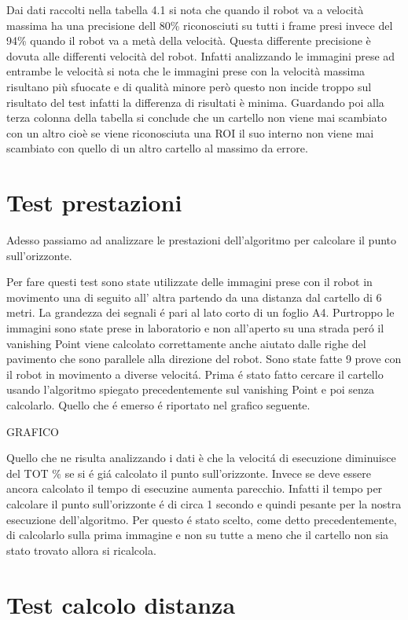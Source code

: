	Dai dati raccolti nella tabella 4.1 si nota che quando il robot va a velocità massima ha una precisione dell 80\% riconosciuti su tutti i frame presi invece del 94\% quando il robot va a metà della velocità. Questa differente precisione è dovuta alle differenti velocità del robot. Infatti analizzando le immagini prese ad entrambe le velocità si nota che le immagini prese con la velocità massima risultano più sfuocate e di qualità minore però questo non incide troppo sul risultato del test infatti la differenza di risultati è minima. Guardando poi alla terza colonna della tabella si conclude che un cartello non viene mai scambiato con un altro cioè se viene riconosciuta una ROI il suo interno non viene mai scambiato con quello di un altro cartello al massimo da errore.

\section{Test prestazioni}

	Adesso passiamo ad analizzare le prestazioni dell'algoritmo per calcolare il punto sull'orizzonte.

	Per fare questi test sono state utilizzate delle immagini prese con il robot in movimento una di seguito all' altra partendo da una distanza dal cartello di 6 metri. La grandezza dei segnali \'e pari al lato corto di un foglio A4. Purtroppo le immagini sono state prese in laboratorio e non all'aperto su una strada per\'o il vanishing Point viene calcolato correttamente anche aiutato dalle righe del pavimento che sono parallele alla direzione del robot. Sono state fatte 9 prove con il robot in movimento a diverse velocit\'a. Prima \'e stato fatto cercare il cartello usando l'algoritmo spiegato precedentemente sul vanishing Point e poi senza calcolarlo. Quello che \'e emerso \'e riportato nel grafico seguente.

	GRAFICO

	Quello che ne risulta analizzando i dati è che la velocit\'a di esecuzione diminuisce del TOT \% se si \'e gi\'a calcolato il punto sull'orizzonte. Invece se deve essere ancora calcolato il tempo di esecuzine aumenta parecchio. Infatti il tempo per calcolare il punto sull'orizzonte \'e di circa 1 secondo e quindi pesante per la nostra esecuzione dell'algoritmo. Per questo \'e stato scelto, come detto precedentemente, di calcolarlo sulla prima immagine e non su tutte a meno che il cartello non sia stato trovato allora si ricalcola.

\section{Test calcolo distanza}

